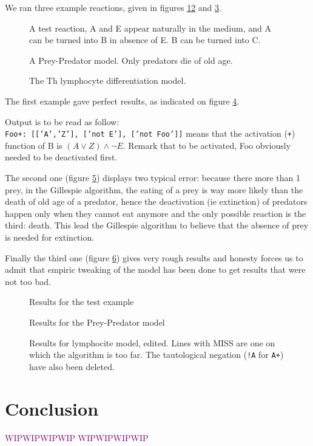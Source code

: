 \documentclass{llncs}
\newcommand{\wip}[1]{\textcolor{Purple}{WIPWIPWIPWIP #1 WIPWIPWIPWIP}}
\begin{document}
We ran three example reactions, given in figures \ref{test}\ref{preypred} and \ref{lympho}.
\begin{figure}[htbp]
	
	\vspace{-1em}
	\caption{A test reaction, A and E appear naturally in the medium, and A can be turned into B in absence of E. B  can be turned into C.\label{test}}
\end{figure}
\begin{figure}[htbp]
	
	\vspace{-1em}
	\caption{A Prey-Predator model. Only predators die of old age.\label{preypred}}
\end{figure}
\begin{figure}[htbp]
	
	\vspace{-1em}
	\caption{The Th lymphocyte differentiation model.\label{lympho}}
\end{figure}

The first example gave perfect results, as indicated on figure \ref{test_res}.

Output is to be read as follow:\\
\texttt{Foo+:~[['A','Z'],~['not~E'],~['not~Foo']]} means that the activation (\texttt{+}) function of B is $(A \vee Z)\wedge\neg E$. Remark that to be activated, Foo obviously needed to be deactivated first.

The second one (figure \ref{preypred_res}) displays two typical error: because there more than 1 prey, in the Gillespie algorithm, the eating of a prey is way more likely than the death of old age of a predator, hence the deactivation (ie extinction) of predators happen only when they cannot eat anymore and the only possible reaction is the third: death. This lead the Gillespie algorithm to believe that the absence of prey is needed for extinction.

Finally the third one (figure \ref{lympho_res}) gives very rough results and honesty forces us to admit that empiric tweaking of the model has been done to get results that were not too bad.

\begin{figure}
	
	\caption{Results for the test example \label{test_res}}
\end{figure}
\begin{figure}
	
	\caption{Results for the Prey-Predator model\label{preypred_res}}
\end{figure}
\begin{figure}
	
	\caption{Results for lymphocite model, edited. Lines with MISS are one on which the algorithm is too far. The tautological negation (\texttt{!A} for \texttt{A+}) have also been deleted.\label{lympho_res}}
\end{figure}

\section{Conclusion}
\wip{}



\end{document}
